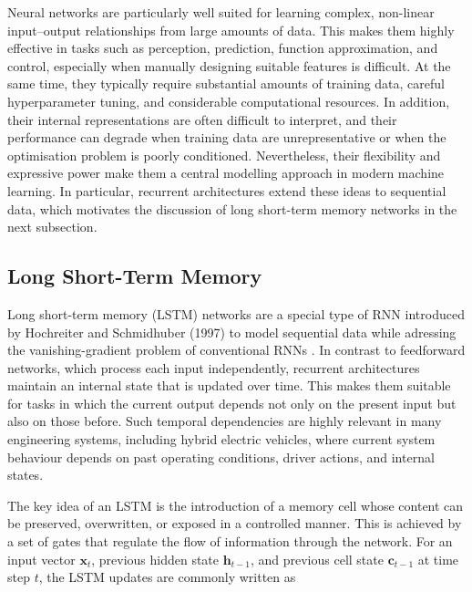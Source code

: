 Neural networks are particularly well suited for learning complex, non-linear input--output relationships from large amounts of data. This makes them highly effective in tasks such as perception, prediction, function approximation, and control, especially when manually designing suitable features is difficult. At the same time, they typically require substantial amounts of training data, careful hyperparameter tuning, and considerable computational resources. In addition, their internal representations are often difficult to interpret, and their performance can degrade when training data are unrepresentative or when the optimisation problem is poorly conditioned. Nevertheless, their flexibility and expressive power make them a central modelling approach in modern machine learning. In particular, recurrent architectures extend these ideas to sequential data, which motivates the discussion of long short-term memory networks in the next subsection.

\subsection{Long Short-Term Memory}
Long short-term memory (LSTM) networks are a special type of \ac{RNN} introduced by Hochreiter and Schmidhuber (1997) to model sequential data while adressing the vanishing-gradient problem of conventional RNNs \cite{hochreiter_long_1997}. In contrast to feedforward networks, which process each input independently, recurrent architectures maintain an internal state that is updated over time. This makes them suitable for tasks in which the current output depends not only on the present input but also on those before. Such temporal dependencies are highly relevant in many engineering systems, including hybrid electric vehicles, where current system behaviour depends on past operating conditions, driver actions, and internal states.

The key idea of an LSTM is the introduction of a memory cell whose content can be preserved, overwritten, or exposed in a controlled manner. This is achieved by a set of gates that regulate the flow of information through the network. For an input vector $\mathbf{x}_t$, previous hidden state $\mathbf{h}_{t-1}$, and previous cell state $\mathbf{c}_{t-1}$ at time step $t$, the LSTM updates are commonly written as


